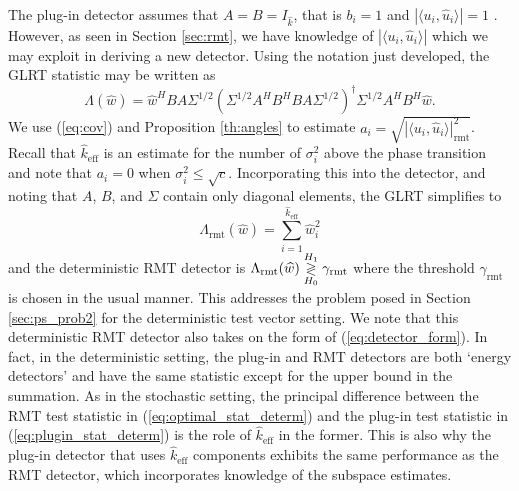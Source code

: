 The plug-in detector assumes that $A=B=I_{\widehat{k}}$, that is $b_i=1$ and $|\langle u_i,\widehat{u}_i\rangle|=1$ . However, as seen in Section \ref{sec:rmt}, we have knowledge of $|\langle u_i,\widehat{u}_i\rangle|$ which we may exploit in deriving a new detector. Using the notation just developed, the GLRT statistic may be written as
\begin{equation*}
\Lambda(\widehat{w})=\widehat{w}^HBA\Sigma^{1/2}(\Sigma^{1/2}A^HB^HBA\Sigma^{1/2})^{\dagger}\Sigma^{1/2}A^HB^H\widehat{w}.
\end{equation*}
We use (\ref{eq:cov}) and Proposition \ref{th:angles} to estimate $a_i=\sqrt{|\langle u_i,\widehat{u}_i\rangle|^2_{\text{rmt}}}$. Recall that $\widehat{k}_{\text{eff}}$ is an estimate for the number of $\sigma_i^2$ above the phase transition and note that $a_i=0$ when $\sigma_i^2\leq\sqrt{c}$. Incorporating this into the detector, and noting that $A$, $B$, and $\Sigma$ contain only diagonal elements, the GLRT simplifies to
\begin{equation}\label{eq:optimal_stat_determ}
\boxed{\Lambda_{\text{rmt}}(\widehat{w}) = \sum_{i=1}^{\widehat{k}_{\text{eff}}}\widehat{w}_i^2}
\end{equation}
and the deterministic RMT detector is $\Lambda_{\text{rmt}}(\widehat{w}) \overset{H_1}{\underset{H_0}{\gtrless}} \gamma_{\text{rmt}}$
where the threshold $\gamma_{\text{rmt}}$ is chosen in the usual manner. This addresses the problem posed in Section \ref{sec:ps_prob2} for the deterministic test vector setting.  We note that this deterministic RMT detector also takes on the form of (\ref{eq:detector_form}). In fact, in the deterministic setting, the plug-in and RMT detectors are both `energy detectors' and have the same statistic except for the upper bound in the summation. As in the stochastic setting, the principal difference between the RMT test statistic in (\ref{eq:optimal_stat_determ}) and the plug-in test statistic in (\ref{eq:plugin_stat_determ}) is the role of $\widehat{k}_{\text{eff}}$ in the former. This is also why the plug-in detector that uses $\widehat{k}_{\text{eff}}$ components exhibits the same performance as the RMT detector, which incorporates knowledge of the subspace estimates. 
